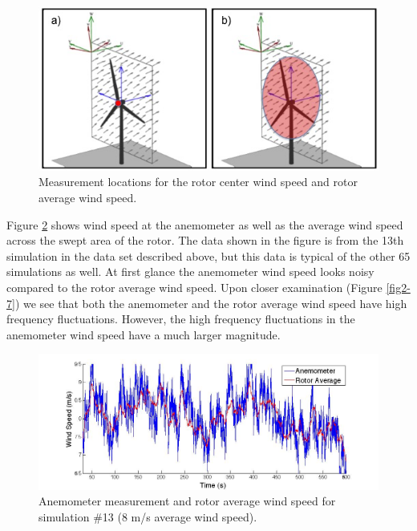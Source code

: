 \begin{figure}[htbp]
	\centering
		\includegraphics[width = \linewidth]{Figures/ch2Figures/fig2-4.jpg}
		
	\caption{Measurement locations for the rotor center wind speed and rotor average wind speed.}
	\label{fig2-4}
\end{figure}

Figure \ref{fig2-6} shows wind speed at the anemometer as well as the average wind speed across the swept area of the rotor. The data shown in the figure is from the 13th simulation in the data set described above, but this data is typical of the other 65 simulations as well. At first glance the anemometer wind speed looks noisy compared to the rotor average wind speed. Upon closer examination (Figure \ref{fig2-7}) we see that both the anemometer and the rotor average wind speed have high frequency fluctuations. However, the high frequency fluctuations in the anemometer wind speed have a much larger magnitude. 

\begin{figure}[htbp]
	\centering
		\includegraphics[width = \linewidth]{Figures/ch2Figures/fig2-6.jpg}
		
	\caption{Anemometer measurement and rotor average wind speed for simulation \#13 (8 m/s average wind speed).}
	\label{fig2-6}
\end{figure}


